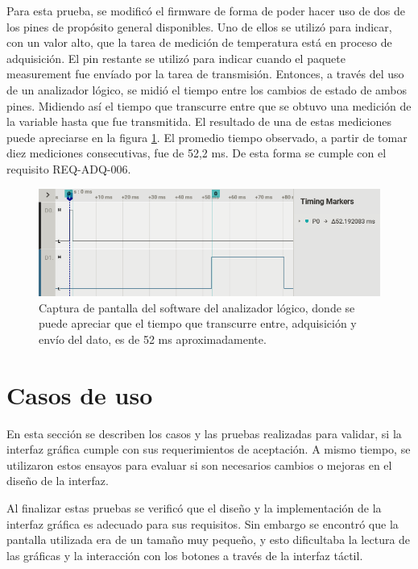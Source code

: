 Para esta prueba, se modificó el firmware de forma de poder hacer uso de dos de los pines de propósito general disponibles. Uno de ellos se utilizó para indicar, con un valor alto, que la tarea de medición de temperatura está en proceso de adquisición. El pin restante se utilizó para indicar cuando el paquete measurement fue envíado por la tarea de transmisión. Entonces, a través del uso de un analizador lógico, se midió el tiempo entre los cambios de estado de ambos pines. Midiendo así el tiempo que transcurre entre que se obtuvo una medición de la variable hasta que fue transmitida. El resultado de una de estas mediciones puede apreciarse en la figura \ref{fig:tiempo-envio}. El promedio tiempo observado, a partir de tomar diez mediciones consecutivas, fue de 52,2 ms. De esta forma se cumple con el requisito REQ-ADQ-006.

\begin{figure}[htpb]
\centering
\includegraphics[width=\textwidth]{./Figures/tiempo-envio.png}
\caption{Captura de pantalla del software del analizador lógico, donde se puede apreciar que el tiempo que transcurre entre, adquisición y envío del dato, es de 52 ms aproximadamente.}
\label{fig:tiempo-envio}
\end{figure}

\section{Casos de uso}

En esta sección se describen los casos y las pruebas realizadas para validar, si la interfaz gráfica cumple con sus requerimientos de aceptación. A mismo tiempo, se utilizaron estos ensayos para evaluar si son necesarios cambios o mejoras en el diseño de la interfaz.

Al finalizar estas pruebas se verificó que el diseño y la implementación de la interfaz gráfica es adecuado para sus requisitos. Sin embargo se encontró que la pantalla utilizada era de un tamaño muy pequeño, y esto dificultaba la lectura de las gráficas y la interacción con los botones a través de la interfaz táctil.

